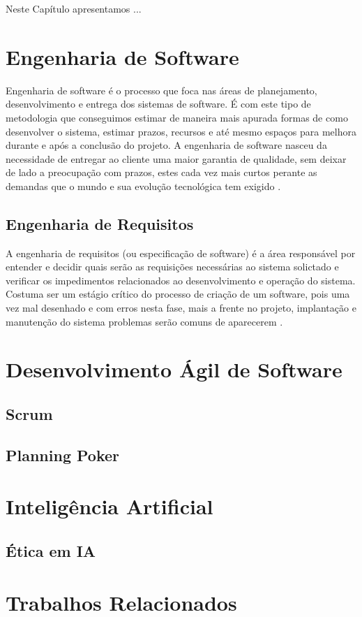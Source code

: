 \label{referencial}

Neste Capítulo apresentamos ...

\section{Engenharia de Software}
 Engenharia de software é o processo que foca nas áreas de planejamento, desenvolvimento e entrega dos sistemas de software. É com este tipo de metodologia que conseguimos estimar de maneira mais apurada formas de como desenvolver o sistema, estimar prazos, recursos e até mesmo espaços para melhora durante e após a conclusão do projeto. A engenharia de software nasceu da necessidade de entregar ao cliente uma maior garantia de qualidade, sem deixar de lado a preocupação com prazos, estes cada vez mais curtos perante as demandas que o mundo e sua evolução tecnológica tem exigido \cite{DBLP:books/lib/Sommerville07}. 

\subsection{Engenharia de Requisitos}
A engenharia de requisitos (ou especificação de software) é a área responsável por entender e decidir quais serão as requisições necessárias ao sistema solictado e verificar os impedimentos relacionados ao desenvolvimento e operação do sistema. Costuma ser um estágio crítico do processo de criação de um software, pois uma vez mal desenhado e com erros nesta fase, mais a frente no projeto, implantação e manutenção do sistema problemas serão comuns de aparecerem \cite{DBLP:books/lib/Sommerville07}.


\section{Desenvolvimento Ágil de Software}

\subsection{Scrum}

\subsection{Planning Poker}

\section{Inteligência Artificial}

\subsection{Ética em IA}


\section{Trabalhos Relacionados}
